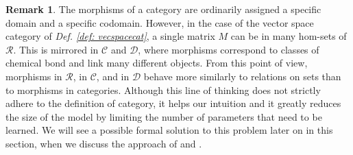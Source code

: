 \documentclass[11pt,a4paper,openright,twoside]{report}
\theoremstyle{plain}
\theoremstyle{definition}
\newtheorem{remark}[proposition]{Remark}
\begin{document}
\begin{remark}
  The morphisms of a category are ordinarily assigned a specific domain and a specific codomain. However, in the case of the vector space category of \textit{Def. \ref{def: vecspacecat}}, a single matrix $M$ can be in many hom-sets of $\mathcal{R}$. This is mirrored in $\mathcal{C}$ and $\mathcal{D}$, where morphisms correspond to classes of chemical bond and link many different objects. From this point of view, morphisms in $\mathcal{R}$, in $\mathcal{C}$, and in $\mathcal{D}$ behave more similarly to relations on sets than to morphisms in categories.  Although this line of thinking does not strictly adhere to the definition of category, it helps our intuition and it greatly reduces the size of the model by limiting the number of parameters that need to be learned. We will see a possible formal solution to this problem later on in this section, when we discuss the approach of \cite{coecke2010mathematical} and \cite{lewis2019compositionality}.
\end{remark}
\end{document}
